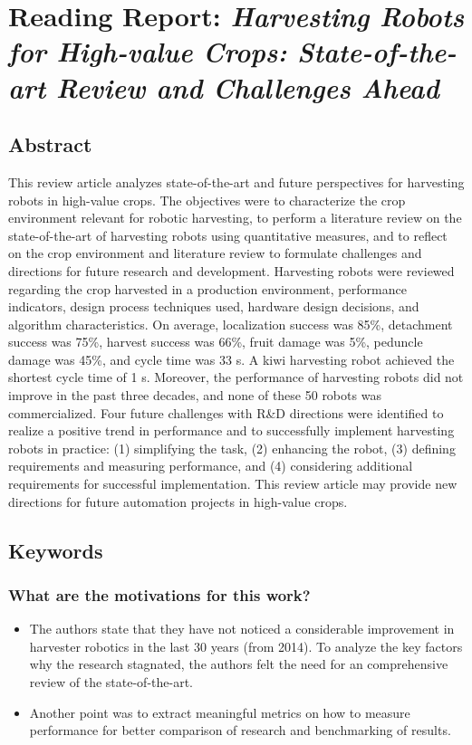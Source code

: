     
    \newpage
    \section{Reading Report: \emph{Harvesting Robots for High-value Crops: State-of-the-art Review and Challenges Ahead}}
    \label{sec:Bac2014}
    \cite{Bac2014}
    
    \subsection*{Abstract}
    This review article analyzes state-of-the-art and future perspectives for harvesting robots in high-value crops.
    The objectives were to characterize the crop environment relevant for robotic harvesting, to perform a literature
    review on the state-of-the-art of harvesting robots using quantitative measures, and to reflect on the crop environment and literature review to formulate challenges and directions for future research and development.
    Harvesting robots were reviewed regarding the crop harvested in a production environment, performance indicators, design process techniques used, hardware design decisions, and algorithm characteristics. On average,
    localization success was 85\%, detachment success was 75\%, harvest success was 66\%, fruit damage was 5\%,
    peduncle damage was 45\%, and cycle time was 33 s. A kiwi harvesting robot achieved the shortest cycle time
    of 1 s. Moreover, the performance of harvesting robots did not improve in the past three decades, and none
    of these 50 robots was commercialized. Four future challenges with R\&D directions were identified to realize
    a positive trend in performance and to successfully implement harvesting robots in practice: (1) simplifying
    the task, (2) enhancing the robot, (3) defining requirements and measuring performance, and (4) considering
    additional requirements for successful implementation. This review article may provide new directions for
    future automation projects in high-value crops.
    \subsection*{Keywords}
    
     
    \subsubsection*{What are the motivations for this work?}
    \begin{itemize}
        \item The authors state that they have not noticed a considerable improvement in harvester robotics in the last 30 years (from 2014). To analyze the key factors why the research stagnated, the authors felt the need for an comprehensive review of the state-of-the-art.
        \item Another point was to extract meaningful metrics on how to measure performance for better comparison of research and benchmarking of results.
    \end{itemize}
